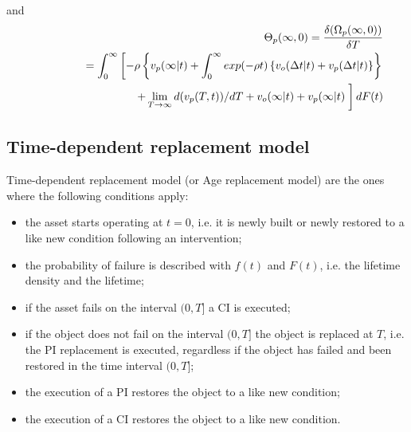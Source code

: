 and
\begin{eqnarray}
&& \Theta_p(\infty,0)  = \frac{\delta (\Omega_p(\infty,0))}{\delta T} \nonumber \\
&& \hspace{14mm} = \int_0^{\infty} \left[-\rho \left\{v_p(\infty|t)+ \int_0^{\infty}exp(-\rho t) \left\{v_o(\Delta t|t)+ v_p(\Delta t|t)  \right\}\right\} \right. \nonumber \\
&& \hspace{20mm} + \mathop {\lim }\limits_{T \to \infty } d(v_p(T,t))/dT + v_o(\infty|t) + v_p(\infty|t) \left.\vphantom{\int_t}\right] dF(t) \label{omegaPI6}
\end{eqnarray}

\subsection{Time-dependent replacement model}
Time-dependent replacement model (or Age replacement model) are the ones where the following conditions apply:
\begin{itemize}
	\item the asset starts operating at $t=0$, i.e. it is newly built or newly restored to a like new condition following an intervention;
	\item the probability of failure is described with $f(t)$ and $F(t)$, i.e. the lifetime density and the lifetime;
	\item if the asset fails on the interval $(0,T]$ a CI is executed;
	\item if the object does not fail on the interval $(0,T]$ the object is replaced at $T$, i.e. the PI replacement is executed, regardless if the object has failed and been restored in the time interval $(0,T]$;
	\item the execution of a PI restores the object to a like new condition;
	\item the execution of a CI restores the object to a like new condition.
\end{itemize}
